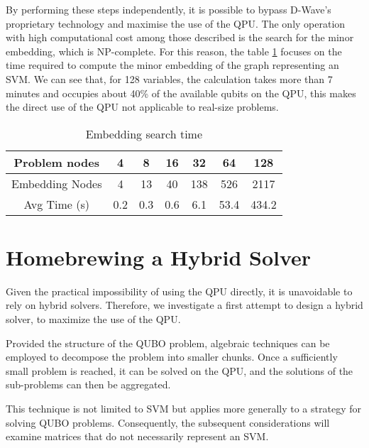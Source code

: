 \documentclass{ceurart}
\begin{document}
\begin{spacing}{1}
By performing these steps independently, it is possible to bypass D-Wave's proprietary technology and maximise the use of the QPU. The only operation with high computational cost among those described is the search for the minor embedding, which is NP-complete. For this reason, the table \ref{tab:embedding} focuses on the time required to compute the minor embedding of the graph representing an SVM. We can see that, for 128 variables, the calculation takes more than 7 minutes and occupies about 40\% of the available qubits on the QPU, this makes the direct use of the QPU not applicable to real-size problems.

\begin{table}
    \caption{Embedding search time}
    \label{tab:embedding}
    \begin{tabular}{ccccccc}
        \toprule
        Problem nodes & 4 & 8 & 16 & 32 & 64 & 128 \\
        \midrule
        Embedding Nodes & 4 & 13 & 40 & 138 & 526 & 2117 \\
        Avg Time (s) & 0.2 & 0.3 & 0.6 & 6.1 & 53.4 & 434.2 \\
        \bottomrule
    \end{tabular}
\end{table}

\section{Homebrewing a Hybrid Solver}

Given the practical impossibility of using the QPU directly, it is unavoidable to rely on hybrid solvers. Therefore, we investigate a first attempt to design a hybrid solver, to maximize the use of the QPU.

Provided the structure of the QUBO problem, algebraic techniques can be employed to decompose the problem into smaller chunks. Once a sufficiently small problem is reached, it can be solved on the QPU, and the solutions of the sub-problems can then be aggregated.

This technique is not limited to SVM but applies more generally to a strategy for solving QUBO problems. Consequently, the subsequent considerations will examine matrices that do not necessarily represent an SVM.

\begin{figure}
    \centering
\end{figure}
\end{spacing}
\end{document}
